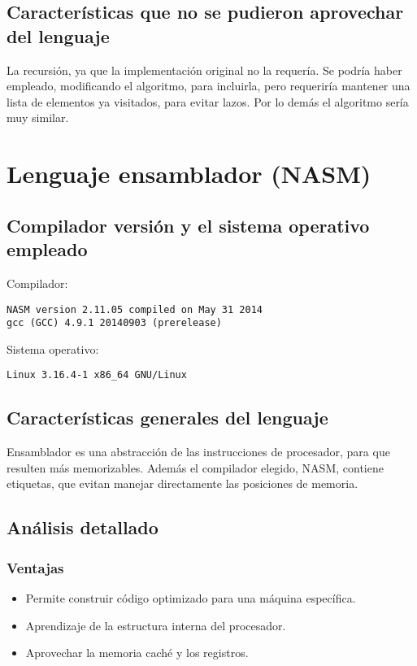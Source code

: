 \documentclass[12pt,a4paper]{article}
\begin{document}
\subsection{Características que no se pudieron aprovechar del lenguaje}
La recursión, ya que la implementación original no la requería. Se podría haber
empleado, modificando el algoritmo, para incluirla, pero requeriría mantener una
lista de elementos ya visitados, para evitar lazos. Por lo demás el algoritmo
sería muy similar.


\section{Lenguaje ensamblador (NASM)}

\subsection{Compilador versión y el sistema operativo empleado}
Compilador:
\begin{lstlisting}
NASM version 2.11.05 compiled on May 31 2014
gcc (GCC) 4.9.1 20140903 (prerelease)
\end{lstlisting}
Sistema operativo:
\begin{lstlisting}
Linux 3.16.4-1 x86_64 GNU/Linux
\end{lstlisting}


\subsection{Características generales del lenguaje}
Ensamblador es una abstracción de las instrucciones de procesador, para que
resulten más memorizables. Además el compilador elegido, NASM, contiene
etiquetas, que evitan manejar directamente las posiciones de memoria.


\subsection{Análisis detallado}

\subsubsection{Ventajas}
\begin{itemize}
\item Permite construir código optimizado para una máquina específica.
\item Aprendizaje de la estructura interna del procesador.
\item Aprovechar la memoria caché y los registros.
\end{itemize}
\end{document}
